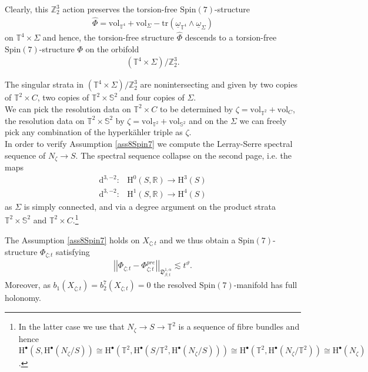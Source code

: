 \documentclass[psamsfonts]{amsart}
\theoremstyle{plain}
\theoremstyle{definition}{
\newtheorem{defi}{Definition}[section]
\newtheorem{ass}{Assumption}
\newtheorem*{nota}{Notation}}
\theoremstyle{remark}{
\newtheorem{rem}{Remark}
\newtheorem{ex}{Example}}
\theoremstyle{plain}{
\newtheorem{thm}{Theorem}[section]
\newtheorem{lem}{Lemma}[section]
\newtheorem{cor}{Corollary}[section]
\newtheorem{prop}{Proposition}[section]
\newtheorem{con}{Conjecture}[section]}
\newcommand{\m}[1]{{\mathrm{#1}}}
\begin{document}
\begin{ex}
Clearly, this $\mathbb{Z}^3_2$ action preserves the torsion-free $\m{Spin}(7)$-structure 
\begin{align*}
    \hat{\Phi}=\m{vol}_{\mathbb{T}^4}+\m{vol}_{\Sigma}-\m{tr}\left(\underline{\omega}_{\mathbb{T}^4}\wedge\underline{\omega}_{\Sigma}\right)
\end{align*}
on $\mathbb{T}^4\times \Sigma$ and hence, the torsion-free structure $\hat{\Phi}$ descends to a torsion-free $\m{Spin}(7)$-structure $\Phi$ on the orbifold
\begin{align*}
    (\mathbb{T}^4\times \Sigma)/\mathbb{Z}^3_2.
\end{align*}

The singular strata in $(\mathbb{T}^4\times \Sigma)/\mathbb{Z}^3_2$ are nonintersecting and given by two copies of $\mathbb{T}^2\times C$, two copies of $\mathbb{T}^2\times \mathbb{S}^2$ and four copies of $\Sigma$.\\

We can pick the resolution data on $\mathbb{T}^2\times C$ to be determined by $\zeta=\m{vol}_{\mathbb{T}^2}+\m{vol}_{C}$, the resolution data on $\mathbb{T}^2\times \mathbb{S}^2$ by $\zeta=\m{vol}_{\mathbb{T}^2}+\m{vol}_{\mathbb{S}^2}$ and on the $\Sigma$ we can freely pick any combination of the hyperkähler triple as $\zeta$.\\

In order to verify Assumption \ref{ass8Spin7} we compute the Lerray-Serre spectral sequence of $N_\zeta\rightarrow S$. The spectral sequence collapse on the second page, i.e. the maps 
\begin{align*}
    \m{d}^{3,-2}\colon&\m{H}^0(S,\mathbb{R})\rightarrow \m{H}^3(S)\\
    \m{d}^{3,-2}\colon&\m{H}^1(S,\mathbb{R})\rightarrow \m{H}^4(S)     
\end{align*}
as $\Sigma$ is simply connected, and via a degree argument on the product strata $\mathbb{T}^2\times \mathbb{S}^2$ and $\mathbb{T}^2\times C$.\footnote{In the latter case we use that $N_\zeta\rightarrow S\rightarrow \mathbb{T}^2$ is a sequence of fibre bundles and hence $\m{H}^\bullet(S,\m{H}^\bullet(N_\zeta/S))\cong \m{H}^\bullet(\mathbb{T}^2,\m{H}^\bullet(S/\mathbb{T}^2,\m{H}^\bullet(N_\zeta/S)))\cong\m{H}^\bullet(\mathbb{T}^2,\m{H}^\bullet(N_\zeta/\mathbb{T}^2))\cong\m{H}^\bullet(N_\zeta)$.}
\end{ex}


\begin{lem}
The Assumption \ref{ass8Spin7} holds on $X_{\zeta;t}$ and we thus obtain a $\m{Spin}(7)$-structure $\Phi_{\zeta;t}$ satisfying 
\begin{align*}
    \left|\left|\Phi_{\zeta;t}-\Phi^{pre}_{\zeta;t}\right|\right|_{\mathfrak{D}^{1,\alpha}_{\beta;t}}\lesssim t^{\vartheta}.
\end{align*}
Moreover, as $b_1(X_{\zeta;t})=b^7_2(X_{\zeta;t})=0$ the resolved $\m{Spin}(7)$-manifold has full holonomy.
\end{lem}
   
\end{document}
